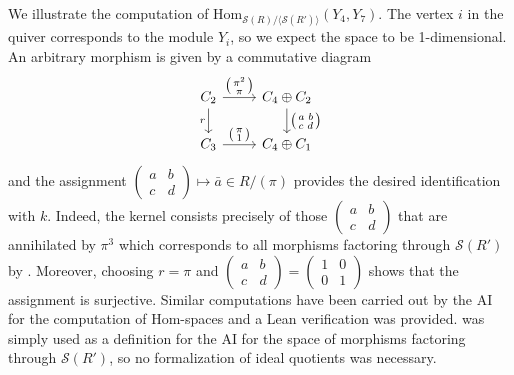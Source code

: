 \documentclass[a4paper]{amsart}
\numberwithin{equation}{section} \theoremstyle{plain}
\numberwithin{thm}{section}
\begin{document}
We illustrate the computation of $\mathrm{Hom}_{\mathcal{S}(R)/\langle \mathcal{S}(R') \rangle} (Y_4, Y_7)$. The vertex $i$ in the quiver corresponds to the module $Y_i$, so we expect the space to be 1-dimensional. An arbitrary morphism is given by a commutative diagram
\begin{equation*}
\begin{tikzcd}
    C_2 \arrow[d, "r", swap] \arrow[r, "\left(\begin{smallmatrix}
    \pi^2 \\ \pi
\end{smallmatrix}\right)"] & C_4\oplus C_2 \arrow[d, "\left( \begin{smallmatrix}
     a \,\, b\\
     c \,\, d
\end{smallmatrix}\right)"]\\
    C_3 \arrow[r, "\left(\begin{smallmatrix}
    \pi \\ 1
\end{smallmatrix}\right)"] & C_4\oplus C_1
\end{tikzcd}
\end{equation*}
and the assignment $\left(\begin{smallmatrix}
    a & b \\ c & d
\end{smallmatrix} \right) \mapsto \bar{a}\in R/(\pi)$ provides the desired identification with $k$. Indeed, the kernel consists precisely of those $\left(\begin{smallmatrix}
    a & b \\ c & d
\end{smallmatrix} \right)$ that are annihilated by $\pi^3$ which corresponds to all morphisms factoring through $\mathcal{S}(R')$ by . Moreover, choosing $r = \pi$ and $\left(\begin{smallmatrix}
    a & b \\ c & d
\end{smallmatrix} \right) = \left(\begin{smallmatrix}
    1 & 0 \\ 0 & 1
\end{smallmatrix} \right)$ shows that the assignment is surjective. Similar computations have been carried out by the AI for the computation of Hom-spaces and a Lean verification was provided.   was simply used as a definition for the AI for the space of morphisms factoring through $\mathcal{S}(R')$, so no formalization of ideal quotients was necessary. 
\end{document}
